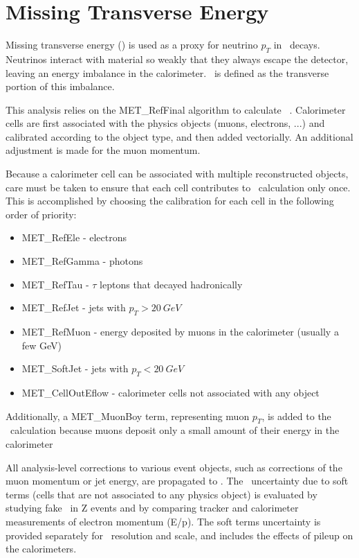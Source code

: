 \section{Missing Transverse Energy}
\label{perf:met:scale}

Missing transverse energy (\met) is used as a proxy for neutrino $p_T$ in \Wmn\ decays. Neutrinos interact with material so weakly that they always escape the detector, leaving an energy imbalance in the calorimeter. \met\ is defined as the transverse portion of this imbalance.

This analysis relies on the MET\_RefFinal algorithm to calculate \met~\cite{ATLAS-CONF-2012-101, Aad:2012re}. Calorimeter cells are first associated with the physics objects (muons, electrons, ...) and calibrated according to the object type, and then added vectorially. An additional adjustment is made for the muon momentum.

Because a calorimeter cell can be associated with multiple reconstructed objects, care must be taken to ensure that each cell contributes to \met\ calculation only once. This is accomplished by choosing the calibration for each cell in the following order of priority:
\begin{itemize}
\item MET\_RefEle - electrons
\item MET\_RefGamma - photons
\item MET\_RefTau - $\tau$ leptons that decayed hadronically
\item MET\_RefJet - jets with $p_T>20\ GeV$
\item MET\_RefMuon - energy deposited by muons in the calorimeter (usually a few GeV)
\item MET\_SoftJet - jets with $p_T<20\ GeV$
\item MET\_CellOutEflow - calorimeter cells not associated with any object
\end{itemize}

Additionally, a MET\_MuonBoy term, representing muon $p_T$, is added to the \met\ calculation because muons deposit only a small amount of their energy in the calorimeter

All analysis-level corrections to various event objects, such as corrections of the muon momentum or jet energy, are propagated to \met. The \MET\ uncertainty due to soft terms (cells that are not associated to any physics object) is evaluated by studying fake \MET\ in Z events and by comparing tracker and calorimeter measurements of electron momentum (E/p). The soft terms uncertainty is provided separately for \MET\ resolution and scale, and includes the effects of pileup on the calorimeters.

